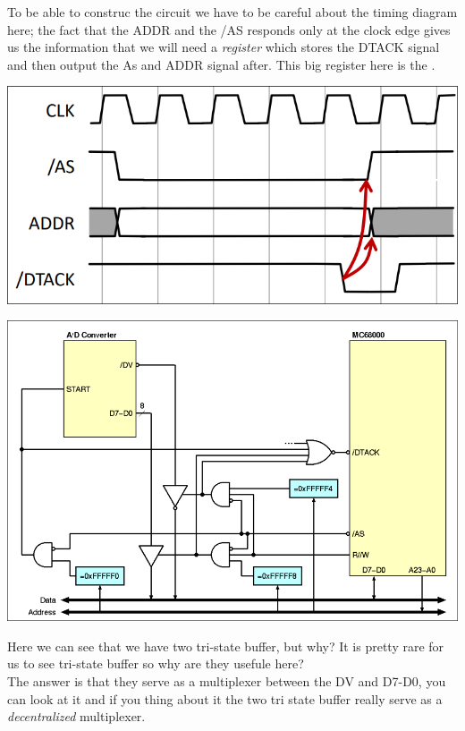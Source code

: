 To be able to construc the circuit we have to be careful about the timing diagram here; the fact that the ADDR and the /AS responds only at the clock edge gives us the information that we will need a \textit{register} which stores the DTACK signal and then output the As and ADDR signal after. This big register here is the .
\begin{center}
\includegraphics[scale=0.2]{screenshots/2025-10-22_8.png}
\end{center}
\begin{center}
\includegraphics[scale=0.2]{screenshots/2025-10-22_9.png}
\end{center}
\begin{framedremark}
Here we can see that we have two tri-state buffer, but why? It is pretty rare for us to see tri-state buffer so why are they usefule here?\\
The answer is that they serve as a multiplexer between the DV and D7-D0, you can look at it and if you thing about it the two tri state buffer really serve as a \textit{decentralized} multiplexer.
\end{framedremark}

